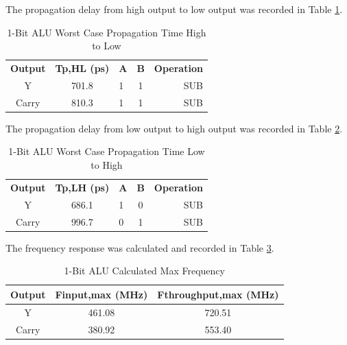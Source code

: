 \documentclass[11pt]{article}
\begin{document}
			The propagation delay from high output to low output was recorded in Table \ref{tab:ALU-1-Bit-Tpd-HL}.
		
			\begin{table}[H]
				\centering
				\caption{1-Bit ALU Worst Case Propagation Time High to Low}
				\label{tab:ALU-1-Bit-Tpd-HL}
				\begin{tabular}{|cclcr|}
					\hline
					\textbf{Output} & \textbf{Tp,HL (ps)} & \textbf{A} & \textbf{B} & \textbf{Operation} \\
					Y               & 701.8                   & 1          & 1          & SUB                \\
					Carry           & 810.3                   & 1          & 1          & SUB                \\
					\hline
				\end{tabular}
			\end{table}
		
			The propagation delay from low output to high output was recorded in Table \ref{tab:ALU-1-Bit-Tpd-LH}.
		
			\begin{table}[H]
				\centering
				\caption{1-Bit ALU Worst Case Propagation Time Low to High}
				\label{tab:ALU-1-Bit-Tpd-LH}
				\begin{tabular}{|cclcr|}
					\hline
					\textbf{Output} & \textbf{Tp,LH (ps)} & \textbf{A} & \textbf{B} & \textbf{Operation} \\
					Y               & 686.1                   & 1          & 0          & SUB                \\
					Carry           & 996.7                   & 0          & 1          & SUB                \\
					\hline
				\end{tabular}
			\end{table}
		
			The frequency response was calculated and recorded in Table \ref{tab:ALU-1-Bit-Freq}.
		
			\begin{table}[H]
				\centering
				\caption{1-Bit ALU Calculated Max Frequency}
				\label{tab:ALU-1-Bit-Freq}
				\begin{tabular}{|ccc|}
					\hline
					\textbf{Output} & \textbf{Finput,max (MHz)} & \textbf{Fthroughput,max (MHz)} \\
					\hline
					Y               & 461.08                    & 720.51                         \\
					Carry           & 380.92                    & 553.40                         \\
					\hline
				\end{tabular}
			\end{table}
		
\end{document}
